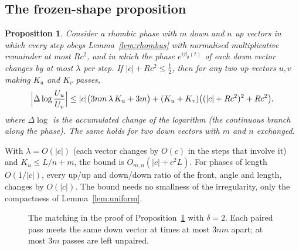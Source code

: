 \documentclass[11pt]{amsart}
\newtheorem{proposition}[lemma]{Proposition}
\theoremstyle{definition}
\begin{document}
\subsection{The frozen-shape proposition}
\begin{proposition}\label{prop:frozen}
Consider a rhombic phase with $m$ down and $n$ up vectors in which every step obeys
Lemma~\ref{lem:rhombus} with normalised multiplicative remainder at most $Rc^2$, and in which the phase $e^{i\beta_d(t)}$ of
each down vector changes by at most $\lambda$ per step. If $|c|+Rc^2\le\tfrac12$, then for any two up
vectors $u,v$ making $K_u$ and $K_v$ passes,
\[
\Bigl|\Delta\log\frac{U_u}{U_v}\Bigr|\le|c|\bigl(3nm\,\lambda\,K_u+3m\bigr)
+(K_u+K_v)\bigl((|c|+Rc^2)^2+Rc^2\bigr),
\]
where $\Delta\log$ is the accumulated change of the logarithm (the continuous branch along the phase).
The same holds for two down vectors with $m$ and $n$ exchanged.
\end{proposition}

With $\lambda=O(|c|)$ (each vector changes by $O(c)$ in the steps that involve it) and
$K_u\le L/n+m$, the bound is $O_{m,n}(|c|+c^2L)$. For phases of length $O(1/|c|)$, every up/up and
down/down ratio of the front, angle and length, changes by $O(|c|)$. The bound needs no smallness of
the irregularity, only the compactness of Lemma~\ref{lem:uniform}.

\begin{figure}[t]
\centering
{}
\caption{The matching in the proof of Proposition~\ref{prop:frozen} with $\delta=2$. Each paired pass
meets the same down vector at times at most $3nm$ apart; at most $3m$ passes are left unpaired.}\label{fig:matching}
\end{figure}
\end{document}
